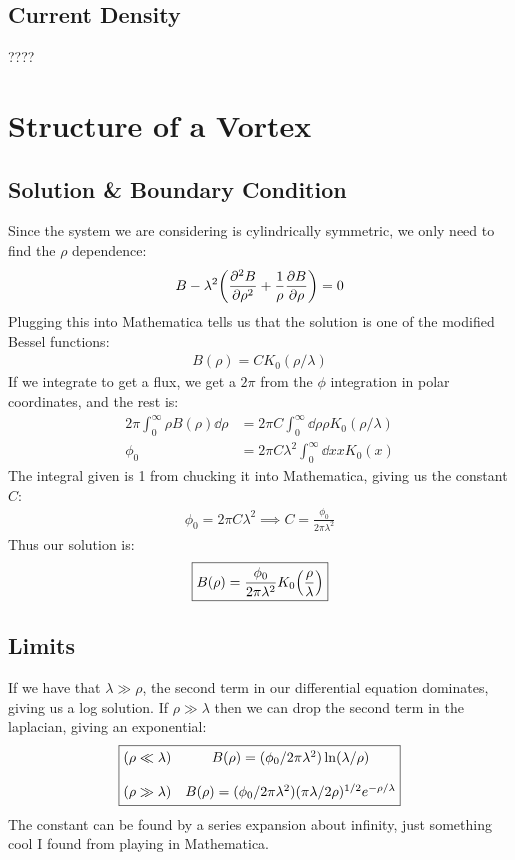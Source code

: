 \documentclass[12pt]{article}
\begin{document}
\subsection{Current Density}
????
\section{Structure of a Vortex}
\subsection{Solution \& Boundary Condition}
Since the system we are considering is cylindrically symmetric, we only need to find the $\rho$ dependence:
\begin{align*}
  B-\lambda^2\qty(\pdv[2]{B}{\rho}+\frac1\rho\pdv{B}{\rho})=0
\end{align*}
Plugging this into Mathematica tells us that the solution is one of the modified Bessel functions:
\begin{align*}
  B(\rho)=CK_0(\rho/\lambda)
\end{align*}
If we integrate to get a flux, we get a $2\pi$ from the $\phi$ integration in polar coordinates, and the rest is:
\begin{align*}
  2\pi\int_0^\infty\rho B(\rho)\dd{\rho}&=2\pi C
  \int_0^\infty\dd{\rho}\rho K_0(\rho/\lambda)\\
  \phi_0&=2\pi C\lambda^2\int_0^\infty\dd{x}xK_0(x)
\end{align*}
The integral given is 1 from chucking it into Mathematica, giving us the constant $C$:
\begin{align*}
  \phi_0=2\pi C\lambda^2\implies \boxed{C=\frac{\phi_0}{2\pi\lambda^2}}
\end{align*}
Thus our solution is:
\begin{align*}
  \boxed{B(\rho)=\frac{\phi_0}{2\pi\lambda^2}K_0\qty(\frac{\rho}{\lambda})}
\end{align*}
\subsection{Limits}
If we have that $\lambda\gg\rho$, the second term in our differential equation dominates, giving us a log solution. If $\rho\gg\lambda$ then we can drop the second term in the laplacian, giving an exponential:
\begin{align*}
  \boxed{
    \mqty{(\rho\ll\lambda)&B(\rho)=(\phi_0/2\pi\lambda^2)\ln(\lambda/\rho)\\\\
    (\rho\gg\lambda)&B(\rho)=(\phi_0/2\pi\lambda^2)(\pi\lambda/2\rho)^{1/2}
    e^{-\rho/\lambda}}}
\end{align*}
The constant can be found by a series expansion about infinity, just something cool I found from playing in Mathematica. 
\end{document}
